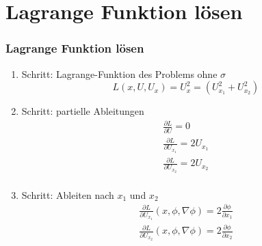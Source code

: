 \documentclass[xcolor=dvipsnames,envcountsect]{beamer}
\begin{document}
\section{Lagrange Funktion lösen}
\begin{frame}
	\frametitle{Lagrange Funktion lösen}
	\begin{enumerate}
		\item<1-> Schritt: Lagrange-Funktion des Problems ohne $\sigma$
		\begin{equation}
			L(x, U, U_x)= U_x^2 = \left(U_{x_1}^2+U_{x_2}^2\right)
		\end{equation}
		\item<2-> Schritt: partielle Ableitungen
		\begin{equation}
			\begin{aligned}
				\frac{\partial L}{\partial U}=0\\
				\frac{\partial L}{\partial U_{x_1}}=2U_{x_1}\\
				\frac{\partial L}{\partial U_{x_2}}=2U_{x_2}\\
			\end{aligned}
		\end{equation}
		\item<3-> Schritt: Ableiten nach $x_1$ und $x_2$
		\begin{equation}
			\begin{aligned}
				\frac{\partial L}{\partial U_{x_1}}(x,\phi,\nabla \phi)=2\frac{\partial \phi}{\partial {x_1}}\\
				\frac{\partial L}{\partial U_{x_2}}(x,\phi,\nabla \phi)=2\frac{\partial \phi}{\partial {x_2}}\\
			\end{aligned}
		\end{equation}
	\end{enumerate}
\end{frame}
\end{document}
